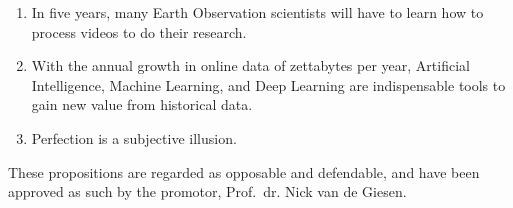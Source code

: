 \documentclass[a4paper,oneside,10pt]{article}
\begin{document}
{\begin{enumerate}
\item In five years, many Earth Observation scientists will have to learn how to process videos to do their research. \\

\item With the annual growth in online data of zettabytes per year, Artificial Intelligence, Machine Learning, and Deep Learning are indispensable tools to gain new value from historical data. \\

\item Perfection is a subjective illusion.

\end{enumerate}
}

\vspace{0.5cm}
\noindent These propositions are regarded as opposable and defendable, and have been approved as such by the promotor, Prof.~dr. Nick van de Giesen.
\end{document}
